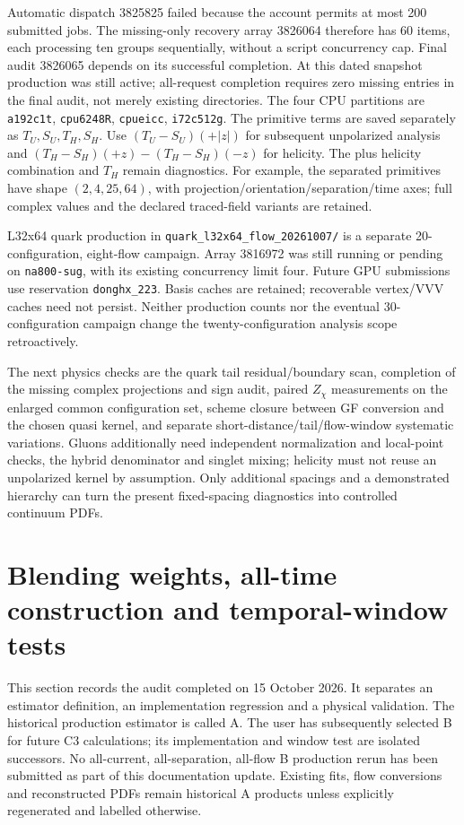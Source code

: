 \documentclass[11pt]{article}
\numberwithin{equation}{section}
\begin{document}
Automatic dispatch 3825825 failed because the account permits at most
200 submitted jobs. The missing-only recovery array 3826064 therefore
has 60 items, each processing ten groups sequentially, without a script
concurrency cap. Final audit 3826065 depends on its successful completion.
At this dated snapshot production was still active; all-request completion
requires zero missing entries in the final audit, not merely existing
directories. The four CPU partitions are
\texttt{a192c1t}, \texttt{cpu6248R}, \texttt{cpueicc}, \texttt{i72c512g}.
The primitive terms are saved separately as \(T_U,S_U,T_H,S_H\).
Use \((T_U-S_U)(+|z|)\) for subsequent unpolarized analysis and
\((T_H-S_H)(+z)-(T_H-S_H)(-z)\) for helicity.
The plus helicity combination and \(T_H\) remain diagnostics.
For example, the separated primitives have shape \((2,4,25,64)\),
with projection/orientation/separation/time axes; full complex values
and the declared traced-field variants are retained.

L32x64 quark production in
\nolinkurl{quark_l32x64_flow_20261007/} is a separate
20-configuration, eight-flow campaign. Array 3816972 was still running
or pending on \texttt{na800-sug}, with its existing concurrency limit four.
Future GPU submissions use reservation \texttt{donghx\_223}.
Basis caches are retained; recoverable vertex/VVV caches need not persist.
Neither production counts nor the eventual 30-configuration campaign
change the twenty-configuration analysis scope retroactively.

The next physics checks are the quark tail residual/boundary scan,
completion of the missing complex projections and sign audit,
paired \(Z_\chi\) measurements on the enlarged common configuration set,
scheme closure between GF conversion and the chosen quasi kernel,
and separate short-distance/tail/flow-window systematic variations.
Gluons additionally need independent normalization and local-point checks,
the hybrid denominator and singlet mixing; helicity must not reuse
an unpolarized kernel by assumption.
Only additional spacings and a demonstrated hierarchy can turn the
present fixed-spacing diagnostics into controlled continuum PDFs.
\clearpage

\section{Blending weights, all-time construction and temporal-window tests}
\label{sec:blending-oct15}

This section records the audit completed on 15 October 2026. It separates
an estimator definition, an implementation regression and a physical
validation. The historical production estimator is called A. The user has
subsequently selected B for future C3 calculations; its implementation and
window test are isolated successors. No all-current, all-separation,
all-flow B production rerun has been submitted as part of this documentation
update. Existing fits, flow conversions and reconstructed PDFs remain
historical A products unless explicitly regenerated and labelled otherwise.
\end{document}
